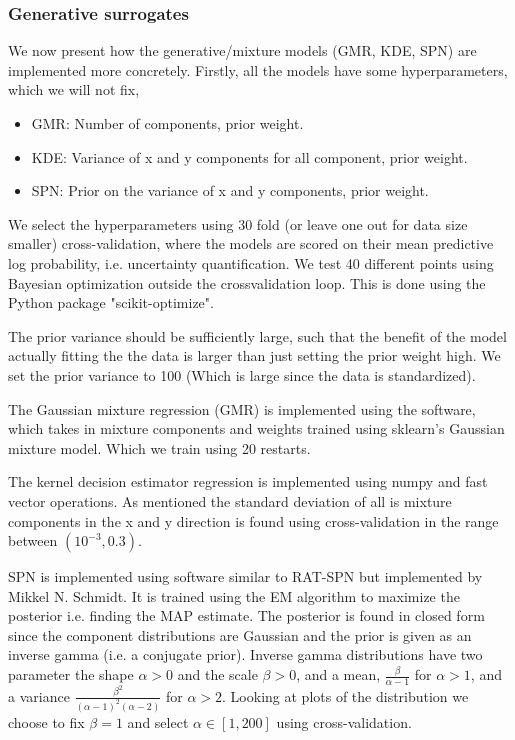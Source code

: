 \subsubsection{Generative surrogates}
We now present how the generative/mixture models (GMR, KDE, SPN) are implemented more concretely. Firstly, 
all the models have some hyperparameters, which we will not fix,  
\begin{itemize}[noitemsep]
  \item GMR: Number of components, prior weight. 
  \item KDE: Variance of x and y components for all component,  prior weight. 
  \item SPN: Prior on the variance of x and y components,  prior weight.
\end{itemize}
We select the hyperparameters using 30 fold (or leave one out for data size smaller) cross-validation, 
where the models are scored on their mean predictive log probability, i.e. uncertainty quantification. 
We test 40 different points using Bayesian optimization outside the crossvalidation loop. This is
done using the Python package "scikit-optimize". 

The prior variance should be sufficiently large, such that the benefit of the model actually fitting the 
the data is larger than just setting the prior weight high. We set the prior variance to 100 (Which is large since the 
data is standardized). 

The Gaussian mixture regression (GMR) is implemented using the software\cite{GMR}, which takes in
mixture components and weights trained using sklearn's Gaussian mixture model. Which we train using
20 restarts.

The kernel decision estimator regression is implemented using numpy and fast vector operations. As
mentioned the standard deviation of all is mixture components in the x and y direction is found
using cross-validation in the range between $(10^{-3}, 0.3)$. 

SPN is implemented using software similar to RAT-SPN but implemented by Mikkel N. Schmidt. It is
trained using the EM algorithm to maximize the posterior i.e. finding the MAP estimate. The
posterior is found in closed form since the component distributions are Gaussian and the prior is
given as an inverse gamma (i.e. a conjugate prior). Inverse gamma distributions have two parameter
the shape $\alpha>0$ and the scale $\beta>0$, and a mean, $\frac{\beta}{\alpha-1}$ for $\alpha >1$, 
and a variance $\frac{\beta^2}{(\alpha-1)^2(\alpha-2)}$ for $\alpha >2$. Looking at plots of the
distribution we choose to fix $\beta =1$ and select $\alpha \in [1,200]$ using cross-validation. 

